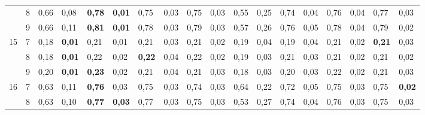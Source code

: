 \documentclass[conference]{IEEEtran}
\begin{document}
\begin{table}[]
\begin{tabular}{|cl|ll|ll|ll|ll|ll|ll|ll|ll|}
		\multicolumn{1}{|c|}{} & 8 & \multicolumn{1}{l|}{0,66} & 0,08 & \multicolumn{1}{l|}{\textbf{0,78}} & \textbf{0,01} & \multicolumn{1}{l|}{0,75} & 0,03 & \multicolumn{1}{l|}{0,75} & 0,03 & \multicolumn{1}{l|}{0,55} & 0,25 & \multicolumn{1}{l|}{0,74} & 0,04 & \multicolumn{1}{l|}{0,76} & 0,04 & \multicolumn{1}{l|}{0,77} & 0,03 \\ \cline{2-18} 
		\multicolumn{1}{|c|}{} & 9 & \multicolumn{1}{l|}{0,66} & 0,11 & \multicolumn{1}{l|}{\textbf{0,81}} & \textbf{0,01} & \multicolumn{1}{l|}{0,78} & 0,03 & \multicolumn{1}{l|}{0,79} & 0,03 & \multicolumn{1}{l|}{0,57} & 0,26 & \multicolumn{1}{l|}{0,76} & 0,05 & \multicolumn{1}{l|}{0,78} & 0,04 & \multicolumn{1}{l|}{0,79} & 0,02 \\ \hline
		\multicolumn{1}{|c|}{\multirow{3}{*}{15}} & 7 & \multicolumn{1}{l|}{0,18} & \textbf{0,01} & \multicolumn{1}{l|}{0,21} & 0,01 & \multicolumn{1}{l|}{0,21} & 0,03 & \multicolumn{1}{l|}{0,21} & 0,02 & \multicolumn{1}{l|}{0,19} & 0,04 & \multicolumn{1}{l|}{0,19} & 0,04 & \multicolumn{1}{l|}{0,21} & 0,02 & \multicolumn{1}{l|}{\textbf{0,21}} & 0,03 \\ \cline{2-18} 
		\multicolumn{1}{|c|}{} & 8 & \multicolumn{1}{l|}{0,18} & \textbf{0,01} & \multicolumn{1}{l|}{0,22} & 0,02 & \multicolumn{1}{l|}{\textbf{0,22}} & 0,04 & \multicolumn{1}{l|}{0,22} & 0,02 & \multicolumn{1}{l|}{0,19} & 0,03 & \multicolumn{1}{l|}{0,21} & 0,03 & \multicolumn{1}{l|}{0,21} & 0,02 & \multicolumn{1}{l|}{0,21} & 0,02 \\ \cline{2-18} 
		\multicolumn{1}{|c|}{} & 9 & \multicolumn{1}{l|}{0,20} & \textbf{0,01} & \multicolumn{1}{l|}{\textbf{0,23}} & 0,02 & \multicolumn{1}{l|}{0,21} & 0,04 & \multicolumn{1}{l|}{0,21} & 0,03 & \multicolumn{1}{l|}{0,18} & 0,03 & \multicolumn{1}{l|}{0,20} & 0,03 & \multicolumn{1}{l|}{0,22} & 0,02 & \multicolumn{1}{l|}{0,21} & 0,03 \\ \hline
		\multicolumn{1}{|c|}{\multirow{3}{*}{16}} & 7 & \multicolumn{1}{l|}{0,63} & 0,11 & \multicolumn{1}{l|}{\textbf{0,76}} & 0,03 & \multicolumn{1}{l|}{0,75} & 0,03 & \multicolumn{1}{l|}{0,74} & 0,03 & \multicolumn{1}{l|}{0,64} & 0,22 & \multicolumn{1}{l|}{0,72} & 0,05 & \multicolumn{1}{l|}{0,75} & 0,03 & \multicolumn{1}{l|}{0,75} & \textbf{0,02} \\ \cline{2-18} 
		\multicolumn{1}{|c|}{} & 8 & \multicolumn{1}{l|}{0,63} & 0,10 & \multicolumn{1}{l|}{\textbf{0,77}} & \textbf{0,03} & \multicolumn{1}{l|}{0,77} & 0,03 & \multicolumn{1}{l|}{0,75} & 0,03 & \multicolumn{1}{l|}{0,53} & 0,27 & \multicolumn{1}{l|}{0,74} & 0,04 & \multicolumn{1}{l|}{0,76} & 0,03 & \multicolumn{1}{l|}{0,75} & 0,03 \\ \cline{2-18} 

\end{tabular}
\end{table}
\end{document}
